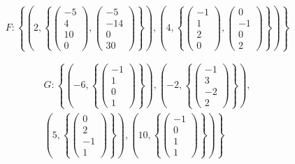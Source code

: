 \documentclass[12pt, a4paper]{article}
\begin{document}
    \begin{equation}
        F: \left\{ 
            \left(2, \left\{\begin{pmatrix} -5\\4\\10\\0 \end{pmatrix}, \begin{pmatrix} -5\\-14\\0\\30 \end{pmatrix} \right\} \right),
            \left(4, \left\{\begin{pmatrix} -1\\1\\2\\0 \end{pmatrix}, \begin{pmatrix} 0\\-1\\0\\2 \end{pmatrix} \right\} \right)
        \right\}
    \end{equation}
    
    \begin{multline}
        G: \left\{
            \left(-6, \left\{\begin{pmatrix} -1\\1\\0\\1 \end{pmatrix} \right\} \right),
            \left(-2, \left\{\begin{pmatrix} -1\\3\\-2\\2 \end{pmatrix} \right\} \right), \right. \\ \left.
            \left(5, \left\{\begin{pmatrix} 0\\2\\-1\\1 \end{pmatrix} \right\} \right),
            \left(10, \left\{\begin{pmatrix} -1\\0\\1\\1 \end{pmatrix} \right\} \right)
        \right\}
    \end{multline}
\end{document}
